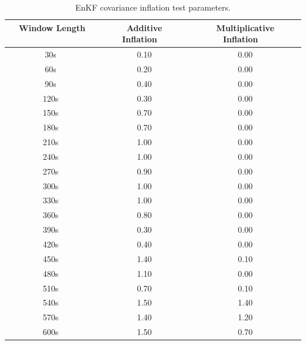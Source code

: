 \documentclass[12pt]{report}
\begin{document}
\begin{table}[h!]
\caption[EnKF covariance inflation test parameters]{EnKF covariance inflation test parameters.}
\begin{center}
\begin{tabular}{ccc}
\hline
{\bf Window Length ~~~~} & {\bf Additive Inflation~~} & {\bf Multiplicative Inflation~~}\\
\hline
\hline
~30s ~& 0.10 & 0.00 \\ \hline
~60s ~& 0.20 & 0.00 \\ \hline
~90s ~& 0.40 & 0.00 \\ \hline
~120s ~& 0.30 & 0.00 \\ \hline
~150s ~& 0.70 & 0.00 \\ \hline
~180s ~& 0.70 & 0.00 \\ \hline
~210s ~& 1.00 & 0.00 \\ \hline
~240s ~& 1.00 & 0.00 \\ \hline
~270s ~& 0.90 & 0.00 \\ \hline
~300s ~& 1.00 & 0.00 \\ \hline
~330s ~& 1.00 & 0.00 \\ \hline
~360s ~& 0.80 & 0.00 \\ \hline
~390s ~& 0.30 & 0.00 \\ \hline
~420s ~& 0.40 & 0.00 \\ \hline
~450s ~& 1.40 & 0.10 \\ \hline
~480s ~& 1.10 & 0.00 \\ \hline
~510s ~& 0.70 & 0.10 \\ \hline
~540s ~& 1.50 & 1.40 \\ \hline
~570s ~& 1.40 & 1.20 \\ \hline
~600s ~& 1.50 & 0.70 \\
\hline
\end{tabular}
\end{center}
\label{table:EnKFCovInfl}
\end{table} 
\end{document}
